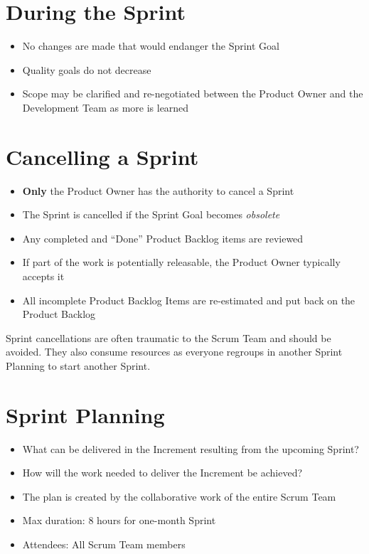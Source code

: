 \documentclass[a4paper,11pt,twocolumn]{article}
\begin{document}
\section*{During the Sprint}
\begin{itemize}
    \item No changes are made that would endanger the Sprint Goal
	\item Quality goals do not decrease
	\item Scope may be clarified and re-negotiated between the Product Owner and the Development Team as more is learned
\end{itemize}

\section*{Cancelling a Sprint}
\begin{itemize}
    \item \textbf{Only} the Product Owner has the authority to cancel a Sprint
	\item The Sprint is cancelled if the Sprint Goal becomes \textit{obsolete}
	\item Any completed and ``Done'' Product Backlog items are reviewed
    \item If part of the work is potentially releasable, the Product Owner typically accepts it
    \item All incomplete Product Backlog Items are re-estimated and put back on the Product Backlog
\end{itemize}

\begin{tcolorbox}[colback=black!8!white,colframe=gray!50!black,title=Note,sharp corners,fonttitle=\normalsize\bfseries,fontupper=\normalsize,left=0.7em,right=0.7em]
	Sprint cancellations are often traumatic to the Scrum Team and should be avoided. They also consume resources as everyone regroups in another Sprint Planning to start another Sprint.
\end{tcolorbox}

\section*{Sprint Planning}
\begin{itemize}
    \item What can be delivered in the Increment resulting from the upcoming Sprint?
	\item How will the work needed to deliver the Increment be achieved?
	\item The plan is created by the collaborative work of the entire Scrum Team
	\item Max duration: 8 hours for one-month Sprint
	\item Attendees: All Scrum Team members
\end{itemize}
\end{document}

